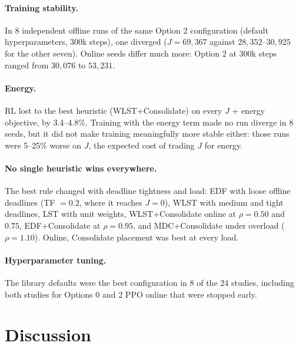 \documentclass[12pt]{article}
\begin{document}
\paragraph{Training stability.} In 8 independent offline runs of the same Option 2 configuration (default hyperparameters, 300k steps), one diverged ($J = 69{,}367$ against $28{,}352$--$30{,}925$ for the other seven). Online seeds differ much more: Option 2 at 300k steps ranged from $30{,}076$ to $53{,}231$.

\paragraph{Energy.} RL lost to the best heuristic (WLST+Consolidate) on every $J$ + energy objective, by 3.4--4.8\%. Training with the energy term made no run diverge in 8 seeds, but it did not make training meaningfully more stable either: those runs were 5--25\% worse on $J$, the expected cost of trading $J$ for energy.

\paragraph{No single heuristic wins everywhere.} The best rule changed with deadline tightness and load: EDF with loose offline deadlines (TF $= 0.2$, where it reaches $J = 0$), WLST with medium and tight deadlines, LST with unit weights, WLST+Consolidate online at $\rho = 0.50$ and $0.75$, EDF+Consolidate at $\rho = 0.95$, and MDC+Consolidate under overload ($\rho = 1.10$). Online, Consolidate placement was best at every load.

\paragraph{Hyperparameter tuning.} The library defaults were the best configuration in 8 of the 24 studies, including both studies for Options 0 and 2 PPO online that were stopped early.

\section{Discussion}\label{sec:discussion}
\end{document}
